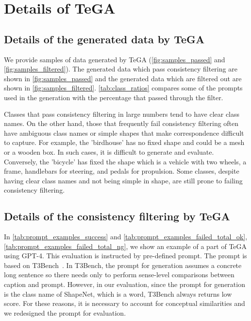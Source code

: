 \section{Details of TeGA}
\subsection{Details of the generated data by TeGA}
We provide samples of data generated by TeGA (\cref{fig:samples_passed} and \cref{fig:samples_filtered}).
The generated data which pass consistency filtering are shown in \cref{fig:samples_passed} and the generated data which are filtered out are shown in \cref{fig:samples_filtered}.
\cref{tab:class_ratios} compares some of the prompts used in the generation with the percentage that passed through the filter.

Classes that pass consistency filtering in large numbers tend to have clear class names. 
On the other hand, those that frequently fail consistency filtering often have ambiguous class names or simple shapes that make correspondence difficult to capture. 
For example, the 'birdhouse' has no fixed shape and could be a mesh or a wooden box. 
In such cases, it is difficult to generate and evaluate.
Conversely, the 'bicycle' has fixed the shape which is a vehicle with two wheels, a frame, handlebars for steering, and pedals for propulsion.
Some classes, despite having clear class names and not being simple in shape, are still prone to failing consistency filtering. 


\subsection{Details of the consistency filtering by TeGA}
\label{app:details_tega}
In \cref{tab:prompt_examples_success} and \cref{tab:prompt_examples_failed_total_ok}, \cref{tab:prompt_examples_failed_total_ng}, we show an example of a part of TeGA using GPT-4.
This evaluation is instructed by pre-defined prompt.
The prompt is based on T3Bench~\cite{he2023t}.
In T3Bench, the prompt for generation assumes a concrete long sentence so there needs only to perform sense-level comparisons between caption and prompt.
However, in our evaluation, since the prompt for generation is the class name of ShapeNet, which is a word, T3Bench always returns low score.
For these reasons, it is necessary to account for conceptual similarities and we redesigned the prompt for evaluation.

